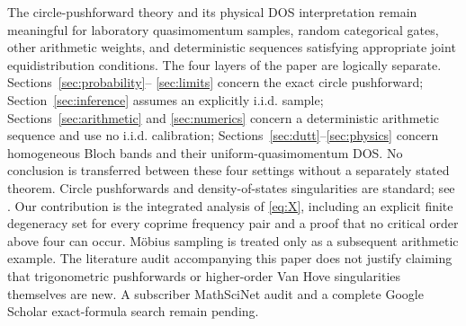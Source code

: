 \documentclass[11pt]{amsart}
\numberwithin{equation}{section}\setcounter{tocdepth}{3}\setcounter{secnumdepth}{3}
\begin{document}
The circle-pushforward theory and its physical DOS interpretation remain meaningful
for laboratory quasimomentum samples, random categorical gates, other arithmetic weights,
and deterministic sequences satisfying appropriate joint equidistribution conditions.
The four layers of the paper are logically separate.  Sections~\ref{sec:probability}--
\ref{sec:limits} concern the exact circle pushforward; Section~\ref{sec:inference}
assumes an explicitly i.i.d. sample; Sections~\ref{sec:arithmetic} and
\ref{sec:numerics} concern a deterministic arithmetic sequence and use no i.i.d.
calibration; Sections~\ref{sec:dutt}--\ref{sec:physics} concern homogeneous Bloch bands
and their uniform-quasimomentum DOS.  No conclusion is transferred between these four
settings without a separately stated theorem.
Circle pushforwards and density-of-states singularities are standard; see
\cite{VanHove1953,ClassenBetouras2025}.  Our contribution is the integrated analysis of
\eqref{eq:X}, including an explicit finite degeneracy set for every coprime frequency
pair and a proof that no critical order above four can occur.  Möbius sampling is treated
only as a subsequent arithmetic example.  The literature audit accompanying this paper does not justify claiming that trigonometric
pushforwards or higher-order Van Hove singularities themselves are new.  A subscriber
MathSciNet audit and a complete Google Scholar exact-formula search remain pending.
\end{document}
